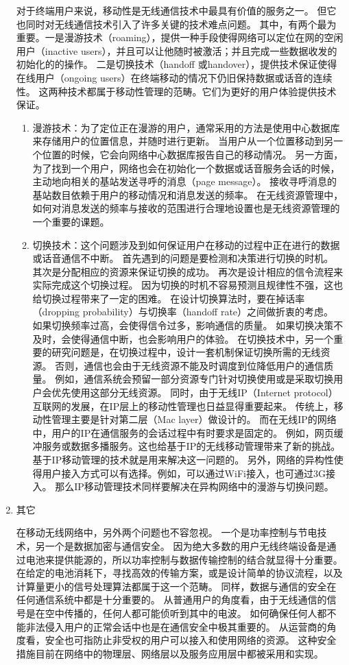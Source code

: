 \begin{enumerate}[1)]
对于终端用户来说，移动性是无线通信技术中最具有价值的服务之一。
但它也同时对无线通信技术引入了许多关键的技术难点问题。
其中，有两个最为重要。一是漫游技术（roaming），提供一种手段使得网络可以定位在网的空闲用户（inactive users），并且可以让他随时被激活；并且完成一些数据收发的初始化的的操作。
二是切换技术（handoff 或handover），提供技术保证使得在线用户（ongoing users）在终端移动的情况下仍旧保持数据或话音的连续性。
这两种技术都属于移动性管理的范畴。它们为更好的用户体验提供技术保证。
\begin{enumerate}[(1)]
\item 漫游技术：为了定位正在漫游的用户，通常采用的方法是使用中心数据库来存储用户的位置信息，并随时进行更新。
当用户从一个位置移动到另一个位置的时候，它会向网络中心数据库报告自己的移动情况。
另一方面，为了找到一个用户，网络也会在初始化一个数据或话音服务会话的时候，主动地向相关的基站发送寻呼的消息（page message）。
接收寻呼消息的基站数目依赖于用户的移动情况和消息发送的频率。
在无线资源管理中，如何对消息发送的频率与接收的范围进行合理地设置也是无线资源管理的一个重要的课题。
\item 切换技术：这个问题涉及到如何保证用户在移动的过程中正在进行的数据或话音通信不中断。
首先遇到的问题是要检测和决策进行切换的时机。
其次是分配相应的资源来保证切换的成功。
再次是设计相应的信令流程来实际完成这个切换过程。
因为切换的时机不容易预测且规律性不强，这也给切换过程带来了一定的困难。
在设计切换算法时，要在掉话率（dropping probability）与切换率（handoff rate）之间做折衷的考虑。
如果切换频率过高，会使得信令过多，影响通信的质量。
如果切换决策不及时，会使得通信中断，也会影响用户的体验。
在切换技术中，另一个重要的研究问题是，在切换过程中，设计一套机制保证切换所需的无线资源。
否则，通信也会由于无线资源不能及时调度到位降低用户的通信质量。
例如，通信系统会预留一部分资源专门针对切换使用或是采取切换用户会优先使用这部分无线资源。
同时，由于无线IP（Internet protocol）互联网的发展，在IP层上的移动性管理也日益显得重要起来。
传统上，移动性管理主要是针对第二层（Mac layer）做设计的。
而在无线IP的网络中，用户的IP在通信服务的会话过程中有时要求是固定的。
例如，网页缓冲服务或数据多播服务。这也给基于IP的无线移动管理带来了新的挑战。
基于IP移动管理的技术就是用来解决这一问题的。
另外，网络的异构性使得用户接入方式可以有选择。例如，可以通过WiFi接入，也可通过3G接入。
那么IP移动管理技术同样要解决在异构网络中的漫游与切换问题。
\end{enumerate}
%
\item 其它
\par 在移动无线网络中，另外两个问题也不容忽视。
一个是功率控制与节电技术，另一个是数据加密与通信安全。
因为绝大多数的用户无线终端设备是通过电池来提供能源的，所以功率控制与数据传输控制的结合就显得十分重要。
在给定的电池消耗下，寻找高效的传输方案，或是设计简单的协议流程，以及计算量更小的信号处理算法都属于这一个范畴。
同样，数据与通信的安全在任何通信系统中都是十分重要的。
从普通用户的角度看，由于无线通信的信号是在空中传播的，任何人都可能侦听到其中的电波。
如何确保任何人都不能非法侵入用户的正常会话中也是在通信安全中极其重要的。
从运营商的角度看，安全也可指防止非受权的用户可以接入和使用网络的资源。
这种安全措施目前在网络中的物理层、网络层以及服务应用层中都被采用和实现。
\end{enumerate}
